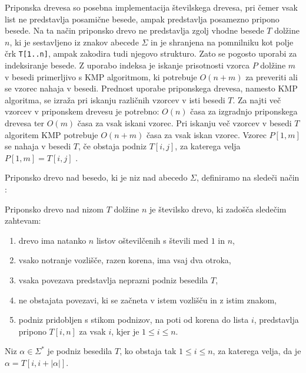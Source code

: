 Priponska drevesa so posebna implementacija številskega drevesa, pri čemer vsak list ne predstavlja posamične besede, ampak predstavlja posamezno pripono besede. Na ta način priponsko drevo ne predstavlja zgolj vhodne besede $T$ dolžine $n$, ki je sestavljeno iz znakov abecede $\Sigma$ in je shranjena na pomnilniku kot polje črk \texttt{T[1..n]}, ampak zakodira tudi njegovo strukturo. Zato se pogosto uporabi za indeksiranje besede. Z uporabo indeksa je iskanje prisotnosti vzorca $P$ dolžine $m$ v besedi primerljivo s KMP algoritmom, ki potrebuje $O(n+m)$ za preveriti ali se vzorec nahaja v besedi. Prednost uporabe priponskega drevesa, namesto KMP algoritma, se izraža pri iskanju različnih vzorcev v isti besedi $T$. Za najti več vzorcev v priponskem drevesu je potrebno: $O(n)$ časa za izgradnjo priponskega drevesa ter $O(m)$ časa za vsak iskani vzorec. Pri iskanju več vzorcev v besedi $T$ algoritem KMP potrebuje $O(n+m)$ časa za vsak iskan vzorec.
Vzorec $P[1,m]$ se nahaja v besedi $T$, če obstaja podniz $T[i,j]$, za katerega velja $P[1,m]=T[i,j]$ \cite{Gusfield1997,KMP}.


%
Priponsko drevo nad besedo, ki je niz nad abecedo $\Sigma$, definiramo na sledeči način \cite{Gusfield1997}:

\begin{defi}\label{def:priposkoDrevo}
    Priponsko drevo nad nizom $T$ dolžine $n$ je številsko drevo, ki zadošča sledečim zahtevam:
    \begin{enumerate}
        \item drevo ima natanko $n$ listov oštevilčenih s števili med $1$ in $n$,
        \item vsako notranje vozlišče, razen korena, ima vsaj dva otroka,
        \item vsaka povezava predstavlja neprazni podniz besedila $T$,
        \item ne obstajata %
        povezavi, ki se začneta v istem vozlišču in z istim znakom,
        \item podniz pridobljen s stikom podnizov, na poti od korena do lista $i$, predstavlja pripono $T[i,n]$ za vsak $i$, kjer je $1 \le i\le n$.        
    \end{enumerate}
\end{defi}

\begin{defi}
    Niz $\alpha\in\Sigma^*$ je podniz besedila $T$, ko obstaja tak $1\le i\le n$, za katerega velja, da je  $\alpha=T[i,i+|\alpha|]$. 
\end{defi}

